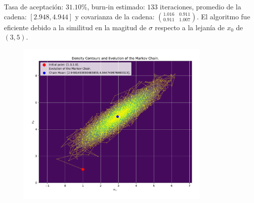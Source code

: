 Tasa de aceptación: $31.10\%$, burn-in estimado: $133$ iteraciones, promedio de la cadena: $[2.948, 4.944]$ y covarianza de la cadena: $\binom{1.016\quad0.911}{0.911\quad1.007}$. El algoritmo fue eficiente debido a la similitud en la magitud de $\sigma$ respecto a la lejanía de $x_0$ de $(3,5)$.
\begin{figure}[h!]
	\centering
	\includegraphics[width=0.84\textwidth]{IMAGENES/ex3/contour_example1.pdf}
\end{figure}
